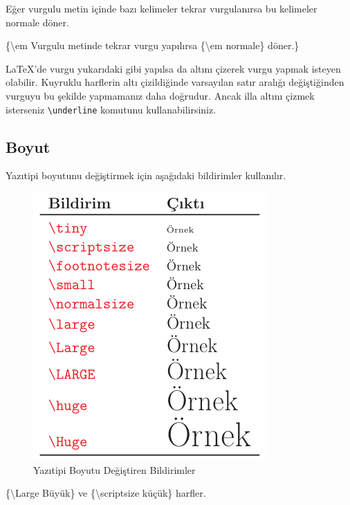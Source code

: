 \documentclass[
  10pt,
]{scrbook}
\newenvironment{Shaded}{\begin{snugshade}}{\end{snugshade}}
\newcommand{\NormalTok}[1]{#1}
\begin{document}
Eğer vurgulu metin içinde bazı kelimeler tekrar vurgulanırsa bu
kelimeler normale döner.

\begin{Shaded}
\begin{Highlighting}[]
\NormalTok{\{\textbackslash{}em Vurgulu metinde tekrar}
\NormalTok{vurgu yapılırsa \{\textbackslash{}em normale\}}
\NormalTok{döner.\}}
\end{Highlighting}
\end{Shaded}

LaTeX'de vurgu yukarıdaki gibi yapılsa da altını çizerek vurgu yapmak
isteyen olabilir. Kuyruklu harflerin altı çizildiğinde varsayılan satır
aralığı değiştiğinden vurguyu bu şekilde yapmamanız daha doğrudur. Ancak
illa altını çizmek isterseniz \texttt{\textbackslash{}underline} komutunu kullanabilirsiniz.

\hypertarget{boyut}{%
\subsection{Boyut}\label{boyut}}

Yazıtipi boyutunu değiştirmek için aşağıdaki bildirimler kullanılır.

\begin{figure}
\centering
\includegraphics{images/yazitipi8.png}
\caption{Yazıtipi Boyutu Değiştiren
Bildirimler}
\end{figure}

\begin{Shaded}
\begin{Highlighting}[]
\NormalTok{\{\textbackslash{}Large Büyük\} ve}
\NormalTok{\{\textbackslash{}scriptsize küçük\} harfler.}
\end{Highlighting}
\end{Shaded}
\end{document}
